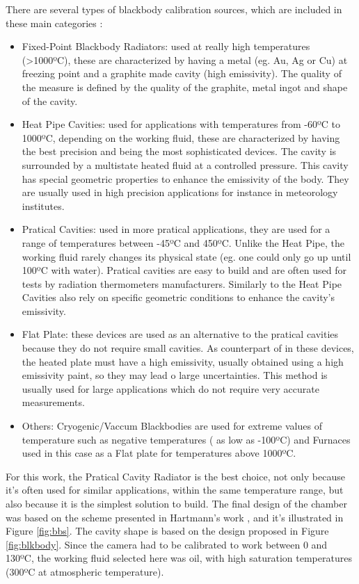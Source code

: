 \par There are several types of blackbody calibration sources, which are included in these main categories \cite{blackbody}: 
\begin{itemize}
\item Fixed-Point Blackbody Radiators: used at really high temperatures (>1000ºC), these are characterized by having a metal (eg. Au, Ag or Cu) at freezing point and a graphite made cavity (high emissivity). The quality of the measure is defined by the quality of the graphite, metal ingot and shape of the cavity.
\item Heat Pipe Cavities: used for applications with temperatures from -60ºC to 1000ºC, depending on the working fluid, these are characterized by having the best precision and being the most sophisticated devices. The cavity is surrounded by a multistate heated fluid at a controlled pressure. This cavity has special geometric properties to enhance the emissivity of the body. They are usually used in high precision applications for instance in meteorology institutes.
\item Pratical Cavities: used in more pratical applications, they are used for a range of temperatures between -45ºC and 450ºC. Unlike the Heat Pipe, the working fluid rarely changes its physical state (eg. one could only go up until 100ºC with water). Pratical cavities are easy to build and are often used for tests by radiation thermometers manufacturers. Similarly to the Heat Pipe Cavities also rely on specific geometric conditions to enhance the cavity's emissivity.
\item Flat Plate: these devices are used as an alternative to the pratical cavities because they do not require small cavities. As counterpart of in these devices, the heated plate must have a high emissivity, usually obtained using a high emissivity paint, so they may lead o large uncertainties. This method is usually used for large applications which do not require very accurate measurements.
\item Others: Cryogenic/Vaccum Blackbodies are used for extreme values of temperature such as negative temperatures ( as low as -100ºC) and Furnaces used in this case as a Flat plate for temperatures above 1000ºC.
\end{itemize}

\par For this work, the Pratical Cavity Radiator is the best choice, not only because it's often used for similar applications, within the same temperature range, but also because it is the simplest solution to build. The final design of the chamber was based on the scheme presented in Hartmann's work \cite{blackbody}, and it's illustrated in Figure \ref{fig:bbs}. The cavity shape is based on the design proposed in Figure \ref{fig:blkbody}. Since the camera had to be calibrated to work between 0 and 130ºC, the working fluid selected here was oil, with high saturation temperatures (300ºC at atmospheric temperature). \\

